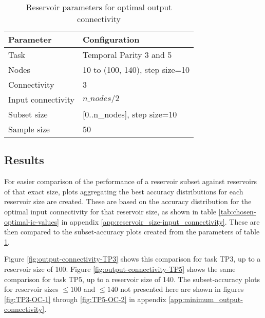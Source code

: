 \begin{table}[ht]
    \centering
    \caption{Reservoir parameters for optimal output connectivity}
    \label{tab:oc-reservoir-parameters}
    \begin{tabular}{ll}
        \hline
        \textbf{Parameter} & \textbf{Configuration} \\
        \hline
        \hline
        Task                & Temporal Parity 3 and 5        \\
        Nodes               & 10 to (100, 140), step size=10 \\
        Connectivity        & 3                              \\
        Input connectivity  & $ n\_nodes / 2 $               \\
        Subset size         & [0..n\_nodes], step size=10    \\
        Sample size         & 50 \\
        \hline
    \end{tabular}
\end{table}

\subsection{Results}

For easier comparison of the performance of a reservoir subset against reservoirs of that exact size,
plots aggregating the best accuracy distributions for each reservoir size are created.
These are based on the accuracy distribution for the optimal input connectivity for that reservoir size,
as shown in table \ref{tab:chosen-optimal-ic-values} in appendix \ref{app:reservoir_size-input_connectivity}.
These are then compared to the subset-accuracy plots created from the parameters of table \ref{tab:oc-reservoir-parameters}.

Figure \ref{fig:output-connectivity-TP3} shows this comparison for task TP3, up to a reservoir size of 100.
Figure \ref{fig:output-connectivity-TP5} shows the same comparison for task TP5, up to a reservoir size of 140.
The subset-accuracy plots for reservoir sizes $ \le 100 $ and $ \le 140 $ not presented here are shown in figures \ref{fig:TP3-OC-1} through \ref{fig:TP5-OC-2} in appendix \ref{app:minimum_output-connectivity}.

